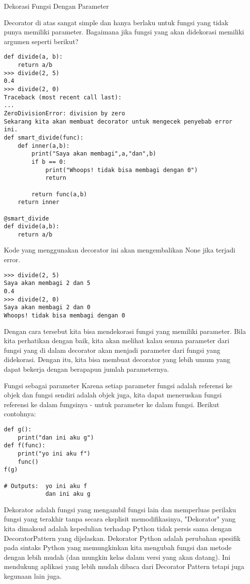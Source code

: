 \documentclass[12pt,a4paper]{article}
\begin{document}
Dekorasi Fungsi Dengan Parameter

Decorator di atas sangat simple dan hanya berlaku untuk fungsi yang tidak punya memiliki parameter. Bagaimana jika fungsi yang akan didekorasi memiliki argumen seperti berikut?
\begin{verbatim}
def divide(a, b):
    return a/b
>>> divide(2, 5)
0.4
>>> divide(2, 0)
Traceback (most recent call last):
...
ZeroDivisionError: division by zero
Sekarang kita akan membuat decorator untuk mengecek penyebab error ini.
def smart_divide(func):
    def inner(a,b):
        print("Saya akan membagi",a,"dan",b)
        if b == 0:
            print("Whoops! tidak bisa membagi dengan 0")
            return

        return func(a,b)
    return inner

@smart_divide
def divide(a,b):
    return a/b
\end{verbatim}

Kode yang menggunakan decorator ini akan mengembalikan None jika terjadi error.
\begin{verbatim}
>>> divide(2, 5)
Saya akan membagi 2 dan 5
0.4
>>> divide(2, 0)
Saya akan membagi 2 dan 0
Whoops! tidak bisa membagi dengan 0
\end{verbatim}

Dengan cara tersebut kita bisa mendekorasi fungsi yang memiliki parameter.
Bila kita perhatikan dengan baik, kita akan melihat kalau semua parameter dari fungsi yang di dalam decorator akan menjadi parameter dari fungsi yang didekorasi. Dengan itu, kita bisa membuat decorator yang lebih umum yang dapat bekerja dengan berapapun jumlah parameternya.


Fungsi sebagai parameter
Karena setiap parameter fungsi adalah referensi ke objek dan fungsi sendiri adalah objek juga, kita dapat meneruskan fungsi referensi ke dalam fungsinya - untuk parameter ke dalam fungsi.
Berikut contohnya: 
\begin{verbatim}
def g():
    print("dan ini aku g")
def f(func):
    print("yo ini aku f")
    func() 
f(g)

# Outputs: 	yo ini aku f
			dan ini aku g
\end{verbatim}


Dekorator adalah fungsi yang mengambil fungsi lain dan memperluas perilaku fungsi yang terakhir tanpa secara eksplisit memodifikasinya, "Dekorator" yang kita dimaksud adalah kepedulian terhadap Python tidak persis sama dengan DecoratorPattern yang dijelaskan. Dekorator Python adalah perubahan spesifik pada sintaks Python yang memungkinkan kita mengubah fungsi dan metode dengan lebih mudah (dan mungkin kelas dalam versi yang akan datang). Ini mendukung aplikasi yang lebih mudah dibaca dari Decorator Pattern tetapi juga kegunaan lain juga.
\end{document}
